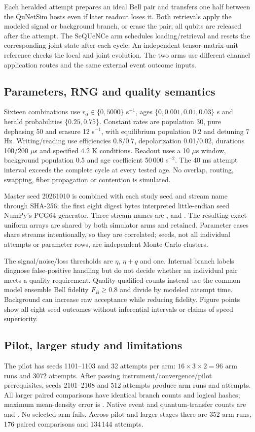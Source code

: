 Each heralded attempt prepares an ideal Bell pair and transfers one half between the QuNetSim hosts even if later readout loses it. Both retrievals apply the modeled signal or background branch, or erase the pair; all qubits are released after the attempt. The SeQUeNCe arm schedules loading/retrieval and resets the corresponding joint state after each cycle. An independent tensor-matrix-unit reference checks the local and joint evolution. The two arms use different channel application routes and the same external event outcome inputs.

\subsection{Parameters, RNG and quality semantics}
Sixteen combinations use $r_0\in\{0,5000\}$ s$^{-1}$, ages $\{0,0.001,0.01,0.03\}$ s and herald probabilities $\{0.25,0.75\}$. Constant rates are population 30, pure dephasing 50 and erasure 12 s$^{-1}$, with equilibrium population 0.2 and detuning 7 Hz. Writing/reading use efficiencies 0.8/0.7, depolarization 0.01/0.02, durations 100/200 $\mu$s and specified 4.2 K conditions. Readout uses a 10 $\mu$s window, background population 0.5 and age coefficient 50\,000 s$^{-2}$. The 40 ms attempt interval exceeds the complete cycle at every tested age. No overlap, routing, swapping, fiber propagation or contention is simulated.

Master seed 20261010 is combined with each study seed and stream name through SHA-256; the first eight digest bytes interpreted little-endian seed NumPy's PCG64 generator. Three stream names are ,  and . The resulting exact uniform arrays are shared by both simulator arms and retained. Parameter cases share streams intentionally, so they are correlated; seeds, not all individual attempts or parameter rows, are independent Monte Carlo clusters.

The signal/noise/loss thresholds are $\eta$, $\eta+q$ and one. Internal branch labels diagnose false-positive handling but do not decide whether an individual pair meets a quality requirement. Quality-qualified counts instead use the common model ensemble Bell fidelity $F_B\geq0.8$ and divide by modeled attempt time. Background can increase raw acceptance while reducing fidelity. Figure points show all eight seed outcomes without inferential intervals or claims of speed superiority.

\subsection{Pilot, larger study and limitations}
The pilot has seeds 1101--1103 and 32 attempts per arm: $16\times3\times2=96$ arm runs and 3072 attempts. After passing instrument/convergence/pilot prerequisites, seeds 2101--2108 and 512 attempts produce \LargerRuns{} arm runs and \LargerAttempts{} attempts. All \LargerPairs{} larger paired comparisons have identical branch counts and logical hashes; maximum mean-density error is \LargerError{}. Native event and quantum-transfer counts are \NativeEvents{} and \NativeTransfers{}. No selected arm fails. Across pilot and larger stages there are 352 arm runs, 176 paired comparisons and 134\,144 attempts.

